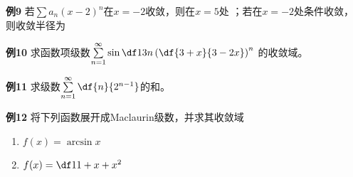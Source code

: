 \begin{frame}
	\linespread{1.5}
	\begin{exampleblock}{{\bf 例9}\hfill}
		若$\sum a_n(x-2)^n$在$x=-2$收敛，则在$x=5$处
		\underline{\;\;}；若在$x=-2$处条件收敛，
		则收敛半径为\underline{\;\uncover<3->{\alert{$4$}}\;}
	\end{exampleblock}
	\bigskip
	\begin{exampleblock}{{\bf 例10}\hfill}
		求函数项级数$\sum\limits_{n=1}^{\infty}
		\sin\df 1 {3n}\left(\df{3+x}{3-2x}\right)^n$
		的收敛域。
	\end{exampleblock}
\end{frame}

\begin{frame}
	\linespread{1.2}
	\begin{exampleblock}{{\bf 例11}\hfill}
		求级数$\sum\limits_{n=1}^{\infty}\df{n}{2^{n-1}}$的和。
	\end{exampleblock}
	\bigskip
	\pause
	\begin{exampleblock}{{\bf 例12}\hfill}
		将下列函数展开成Maclaurin级数，并求其收敛域
		\begin{enumerate}
		  \item $f(x)=\arcsin x$
		  \item $f(x)=\df 1{1+x+x^2}$
		\end{enumerate}
	\end{exampleblock}
\end{frame}


% 
